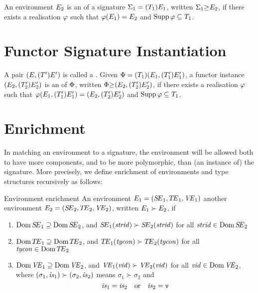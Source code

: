 \begin{definition}{}
An environment $E_2$ is an  of a signature
$\Sigma_1=(T_{1})E_{1}$,
written $\Sigma_1 {\geq_{}} E_2$, if there exists a realisation
$\varphi$
such that $\varphi(E_1)=E_2$ and $\mathop{\rm Supp}\nolimits\varphi\subseteq T_1$.
\end{definition}

\section{Functor Signature Instantiation}

\begin{definition}{}
A pair $(E,(T')E')$ is called a .
Given $\Phi=(T_{1})(E_{1},(T_{1}')E_{1}')$,
a functor instance $(E_2,(T_2')E_2')$ is an  of
$\Phi$,
written $\Phi {\geq_{}} (E_2,(T_2')E_2')$,
if there exists a realisation $\varphi$
such that
$\varphi(E_1,(T_1')E_1')=(E_2,(T_2')E_2')$ and
$\mathop{\rm Supp}\nolimits\varphi\subseteq T_1$.
\end{definition}

\section{Enrichment}

\begin{clause}{}
In matching an environment to a signature, the environment will be
allowed both to have more components, and to be more polymorphic, than
(an instance of) the signature. More precisely, we define enrichment of
environments and type structures recursively as follows:
\end{clause}

\begin{definition}{Environment enrichment}
An environment $E_{1}=(\mbox{$S\!E$}_{1},\mbox{$T\!E$}_{1},\textit{V\kern-.05emE\/}_{1})$  another environment
$E_{2} = (\mbox{$S\!E$}_{2},\mbox{$T\!E$}_{2},\textit{V\kern-.05emE\/}_{2})$, written $E_1\succ E_2$,
if
\begin{enumerate}
\item $\mathop{\rm Dom}\nolimits\mbox{$S\!E$}_1\supseteq\mathop{\rm Dom}\nolimits\mbox{$S\!E$}_2$, and $\mbox{$S\!E$}_1(\textit{strid\/})\succ\mbox{$S\!E$}_2(\textit{strid\/})$
                                               for all $\textit{strid\/}\in\mathop{\rm Dom}\nolimits\mbox{$S\!E$}_2$
\item $\mathop{\rm Dom}\nolimits\mbox{$T\!E$}_1\supseteq\mathop{\rm Dom}\nolimits\mbox{$T\!E$}_2$, and $\mbox{$T\!E$}_1(\textit{tycon\/})\succ\mbox{$T\!E$}_2(\textit{tycon\/})$
                                               for all $\textit{tycon\/}\in\mathop{\rm Dom}\nolimits\mbox{$T\!E$}_2$
\item $\mathop{\rm Dom}\nolimits\textit{V\kern-.05emE\/}_1\supseteq\mathop{\rm Dom}\nolimits\textit{V\kern-.05emE\/}_2$, and $\textit{V\kern-.05emE\/}_1(\textit{vid\/})\succ\textit{V\kern-.05emE\/}_2(\textit{vid\/})$
                                               for all $\textit{vid\/}\in\mathop{\rm Dom}\nolimits\textit{V\kern-.05emE\/}_2$,
where $(\sigma_1,\textit{is\/}_1)\succ(\sigma_2,\textit{is\/}_2)$ means $\sigma_1\succ\sigma_2$ and
$$\textit{is\/}_1 = \textit{is\/}_2\quad\hbox{or}\quad \textit{is\/}_2 = \hbox{\tt v}$$
\end{enumerate}
\end{definition}

